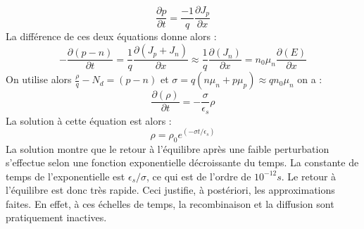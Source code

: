 \begin{equation}
\frac{\partial p}{\partial t}=\frac{-1}{q}\frac{\partial J_p}{\partial x}
\end{equation}
La différence de ces deux équations donne alors :
\begin{equation}
-\frac{\partial (p-n)}{\partial t}=\frac{1}{q}\frac{\partial (J_p+J_n)}{\partial x} \approx \frac{1}{q}\frac{\partial (J_n)}{\partial x} = n_0\mu _n \frac{\partial (E)}{\partial x}
\end{equation}
On utilise alors $\frac{\rho}{q}-N_d=(p-n)$ et $\sigma=q(n\mu _n+p\mu _p) \approx q n_0 \mu _n$ on a :
\begin{equation}
\frac{\partial (\rho)}{\partial t}=-\frac{\sigma}{\epsilon _s} \rho 
\end{equation}
La solution à cette équation est alors :
\begin{equation}
\rho =\rho _0 e^{(- \sigma t/\epsilon _s)}
\end{equation}
La solution montre que le retour à l'équilibre après une faible perturbation s'effectue selon une fonction exponentielle décroissante du temps. La constante de temps de l'exponentielle est $\epsilon _s / \sigma$, ce qui est de l'ordre de $10^{-12}s$. Le retour à l'équilibre est donc très rapide. Ceci justifie, à postériori, les approximations faites. En effet, à ces échelles de temps, la recombinaison et la diffusion sont pratiquement inactives.


